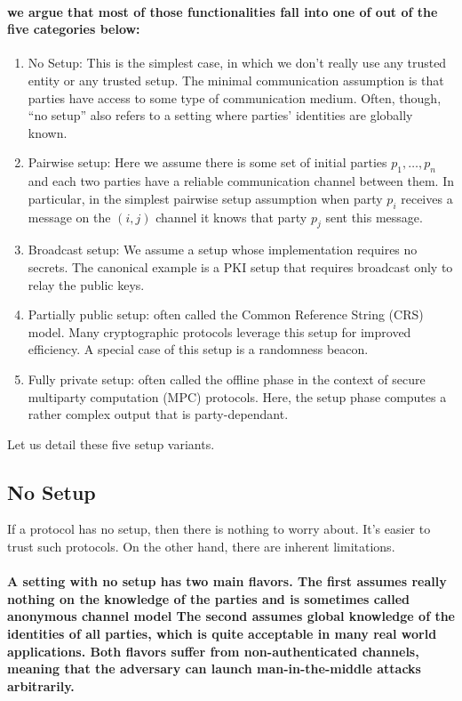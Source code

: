 \paragraph{we argue that most of those functionalities fall into one of out
of the five categories below:}
\begin{enumerate}
\item No Setup: This is the simplest case, in which we don\textquoteright t
really use any trusted entity or any trusted setup. The minimal communication
assumption is that parties have access to some type of communication
medium. Often, though, \textquotedblleft no setup\textquotedblright{}
also refers to a setting where parties\textquoteright{} identities
are globally known.
\item Pairwise setup: Here we assume there is some set of initial parties
$p_{1},\dots,p_{n}$ and each two parties have a reliable communication
channel between them. In particular, in the simplest pairwise setup
assumption when party $p_{i}$ receives a message on the $(i,j)$
channel it knows that party $p_{j}$ sent this message. 
\item Broadcast setup: We assume a setup whose implementation requires no
secrets. The canonical example is a PKI setup that requires broadcast
only to relay the public keys. 
\item Partially public setup: often called the Common Reference String (CRS)
model. Many cryptographic protocols leverage this setup for improved
efficiency. A special case of this setup is a randomness beacon. 
\item Fully private setup: often called the offline phase in the context
of secure multiparty computation (MPC) protocols. Here, the setup
phase computes a rather complex output that is party-dependant.
\end{enumerate}
Let us detail these five setup variants.

\subsection{No Setup }

If a protocol has no setup, then there is nothing to worry about.
It\textquoteright s easier to trust such protocols. On the other hand,
there are inherent limitations.

\paragraph{A setting with no setup has two main flavors. The first assumes really
nothing on the knowledge of the parties and is sometimes called anonymous
channel model The second assumes global knowledge of the identities
of all parties, which is quite acceptable in many real world applications.
Both flavors suffer from non-authenticated channels, meaning that
the adversary can launch man-in-the-middle attacks arbitrarily.}

